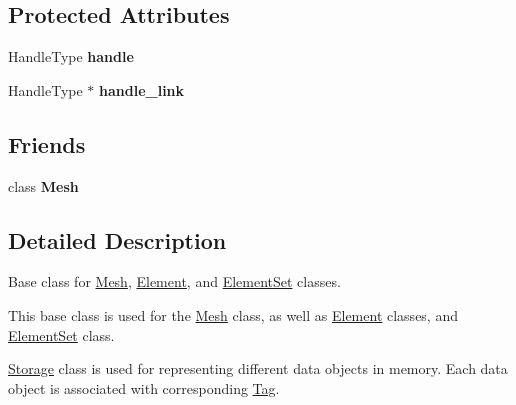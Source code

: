 \subsection*{Protected Attributes}
\begin{DoxyCompactItemize}
\item 
\hypertarget{classINMOST_1_1Storage_a3a9a0f8e226821c92b8e5c253e4474be}{Handle\-Type {\bfseries handle}}\label{classINMOST_1_1Storage_a3a9a0f8e226821c92b8e5c253e4474be}

\item 
\hypertarget{classINMOST_1_1Storage_a14f2ee75267f3c967db30b79558360a5}{Handle\-Type $\ast$ {\bfseries handle\-\_\-link}}\label{classINMOST_1_1Storage_a14f2ee75267f3c967db30b79558360a5}

\end{DoxyCompactItemize}
\subsection*{Friends}
\begin{DoxyCompactItemize}
\item 
\hypertarget{classINMOST_1_1Storage_aa41a130f156b145bffb3f4b5172c4c93}{class {\bfseries Mesh}}\label{classINMOST_1_1Storage_aa41a130f156b145bffb3f4b5172c4c93}

\end{DoxyCompactItemize}


\subsection{Detailed Description}
Base class for \hyperlink{classINMOST_1_1Mesh}{Mesh}, \hyperlink{classINMOST_1_1Element}{Element}, and \hyperlink{classINMOST_1_1ElementSet}{Element\-Set} classes. 

This base class is used for the \hyperlink{classINMOST_1_1Mesh}{Mesh} class, as well as \hyperlink{classINMOST_1_1Element}{Element} classes, and \hyperlink{classINMOST_1_1ElementSet}{Element\-Set} class.

\hyperlink{classINMOST_1_1Storage}{Storage} class is used for representing different data objects in memory. Each data object is associated with corresponding \hyperlink{classINMOST_1_1Tag}{Tag}. 


